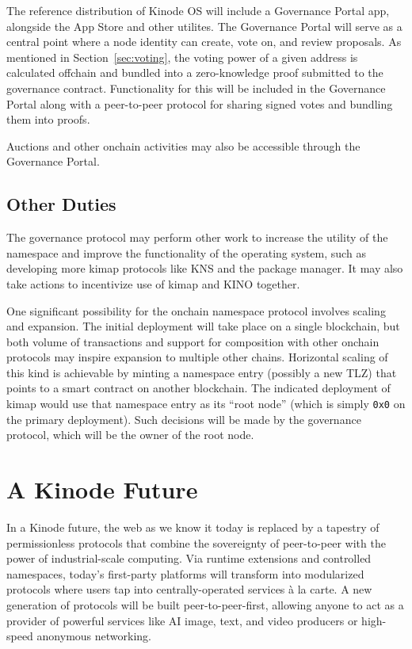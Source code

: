 \documentclass[runningheads]{llncs}
\begin{document}
The reference distribution of Kinode OS will include a Governance Portal app, alongside the App Store and other utilites.
The Governance Portal will serve as a central point where a node identity can create, vote on, and review proposals.
As mentioned in Section~\ref{sec:voting}, the voting power of a given address is calculated offchain and bundled into a zero-knowledge proof submitted to the governance contract.
Functionality for this will be included in the Governance Portal along with a peer-to-peer protocol for sharing signed votes and bundling them into proofs.

Auctions and other onchain activities may also be accessible through the Governance Portal.

\subsection{Other Duties}
\label{sec:govduties}

The governance protocol may perform other work to increase the utility of the namespace and improve the functionality of the operating system, such as developing more kimap protocols like KNS and the package manager.
It may also take actions to incentivize use of kimap and KINO together.

One significant possibility for the onchain namespace protocol involves scaling and expansion.
The initial deployment will take place on a single blockchain, but both volume of transactions and support for composition with other onchain protocols may inspire expansion to multiple other chains.
Horizontal scaling of this kind is achievable by minting a namespace entry (possibly a new TLZ) that points to a smart contract on another blockchain.
The indicated deployment of kimap would use that namespace entry as its ``root node'' (which is simply \verb|0x0| on the primary deployment).
Such decisions will be made by the governance protocol, which will be the owner of the root node.

\clearpage

\section{A Kinode Future}
\label{sec:future}

In a Kinode future, the web as we know it today is replaced by a tapestry of permissionless protocols that combine the sovereignty of peer-to-peer with the power of industrial-scale computing.
Via runtime extensions and controlled namespaces, today's first-party platforms will transform into modularized protocols where users tap into centrally-operated services à la carte.
A new generation of protocols will be built peer-to-peer-first, allowing anyone to act as a provider of powerful services like AI image, text, and video producers or high-speed anonymous networking.
\end{document}
